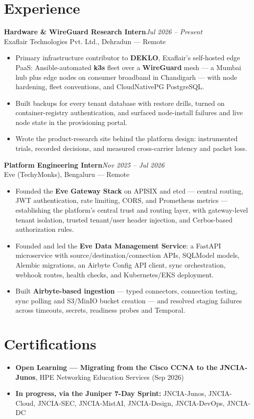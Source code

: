\documentclass[10pt,a4paper]{article}
\newcommand{\entry}[3]{%
  \textbf{#1}\hfill\textit{\small #2}\\[-0.15em]
  {\small #3}\par\vspace{0.08em}%
}
\begin{document}
\section{Experience}
\entry{Hardware \& WireGuard Research Intern}{Jul 2026 -- Present}{Exaflair Technologies Pvt. Ltd., Dehradun --- Remote}
\begin{itemize}
  \item Primary infrastructure contributor to \textbf{DEKLO}, Exaflair's self-hosted edge PaaS: Ansible-automated \textbf{k3s} fleet over a \textbf{WireGuard} mesh --- a Mumbai hub plus edge nodes on consumer broadband in Chandigarh --- with node hardening, fleet conventions, and CloudNativePG PostgreSQL.
  \item Built backups for every tenant database with restore drills, turned on container-registry authentication, and surfaced node-install failures and live node state in the provisioning portal.
  \item Wrote the product-research site behind the platform design: instrumented trials, recorded decisions, and measured cross-carrier latency and packet loss.
\end{itemize}

\entry{Platform Engineering Intern}{Nov 2025 -- Jul 2026}{Eve (TechyMonks), Bengaluru --- Remote}
\begin{itemize}
  \item Founded the \textbf{Eve Gateway Stack} on APISIX and etcd --- central routing, JWT authentication, rate limiting, CORS, and Prometheus metrics --- establishing the platform's central trust and routing layer, with gateway-level tenant isolation, trusted tenant/user header injection, and Cerbos-based authorization rules.
  \item Founded and led the \textbf{Eve Data Management Service}: a FastAPI microservice with source/destination/connection APIs, SQLModel models, Alembic migrations, an Airbyte Config API client, sync orchestration, webhook routes, health checks, and Kubernetes/EKS deployment.
  \item Built \textbf{Airbyte-based ingestion} --- typed connectors, connection testing, sync polling and S3/MinIO bucket creation --- and resolved staging failures across timeouts, secrets, readiness probes and Temporal.
\end{itemize}

\section{Certifications}
\begin{itemize}
  \item \textbf{Open Learning --- Migrating from the Cisco CCNA to the JNCIA-Junos}, HPE Networking Education Services (Sep 2026)
  \item \textbf{In progress, via the Juniper 7-Day Sprint:} JNCIA-Junos, JNCIA-Cloud, JNCIA-SEC, JNCIA-MistAI, JNCIA-Design, JNCIA-DevOps, JNCIA-DC
\end{itemize}
\end{document}
